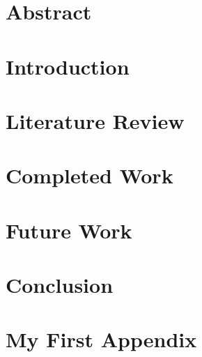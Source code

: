 \documentclass[a4paper,11pt,twoside]{report}
\author{\me}
\begin{document}


\normalsize

\chapter*{Abstract}\label{chapter:Abstract}
\setcounter{page}{0}


\tableofcontents

\chapter{Introduction}\label{chapter:Introduction}
\setcounter{page}{0}


\chapter{Literature Review}\label{chapter:Literature Review}


\chapter{Completed Work}\label{chapter:Completed Work}


\chapter{Future Work}\label{chapter:Future Work}


\chapter{Conclusion}\label{chapter:Conclusion}




\newpage

\appendix
\chapter{My First Appendix}\label{chapter:Appendix A}

\end{document}

